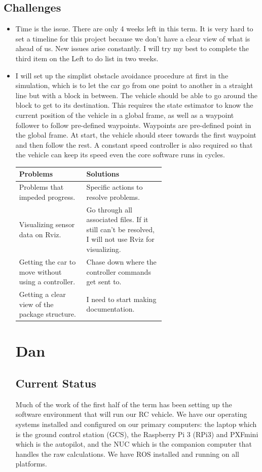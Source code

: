 \documentclass[compsoc,draftclsnofoot,onecolumn,10pt]{IEEEtran}
\begin{document}
\subsection{Challenges}
	\begin{itemize}
		\item Time is the issue. There are only 4 weeks left in this term. It is very hard to set a timeline for this project because we don't have a clear view of what is ahead of us. New issues arise constantly. I will try my best to complete the third item on the Left to do list in two weeks.
		\item I will set up the simplist obstacle avoidance procedure at first in the simulation, which is to let the car go from one point to another in a straight line but with a block in between. The vehicle should be able to go around the block to get to its destination. This requires the state estimator to know the current position of the vehicle in a global frame, as well as a waypoint follower to follow pre-defined waypoints. Waypoints are pre-defined point in the global frame. At start, the vehicle should steer towards the first waypoint and then follow the rest. A constant speed controller is also required so that the vehicle can keep its speed even the core software runs in cycles.   
\begin{tabular}{|p{0.3\linewidth}|p{0.3\linewidth}|}
	\hline
	\textbf{Problems} & \textbf{Solutions}\\
	\hline
	Problems that impeded progress. & Specific actions to resolve problems.\\
	\hline
	Visualizing sensor data on Rviz. & Go through all associated files. If it still can't be resolved, I will not use Rviz for visualizing. \\
	\hline
	Getting the car to move without using a controller. & Chase down where the controller commands get sent to. \\
	\hline
	Getting a clear view of the package structure. & I need to start making documentation. \\
	\hline
\end{tabular}

\section{Dan}
\subsection{Current Status}
Much of the work of the first half of the term has been setting up the software environment that will run our RC vehicle.
We have our operating systems installed and configured on our primary computers: the laptop which is the ground control station (GCS), the Raspberry Pi 3 (RPi3) and PXFmini which is the autopilot, and the NUC which is the companion computer that handles the raw calculations. We have ROS installed and running on all platforms.\par


\end{itemize}
\end{document}
